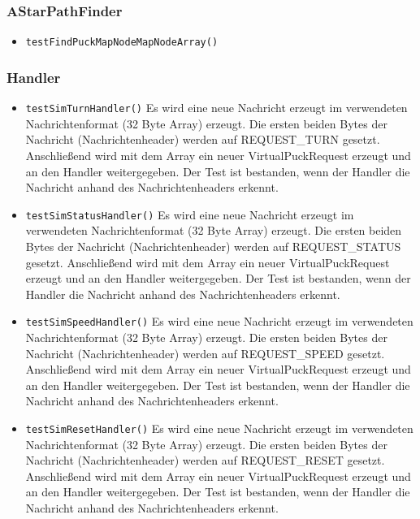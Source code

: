 \documentclass[10pt,a4paper]{article}
\begin{document}
			\subsubsection{AStarPathFinder}
			\begin{itemize}
				\item \texttt{testFindPuckMapNodeMapNodeArray()} 
			\end{itemize}
			
			\subsubsection{Handler}
			\begin{itemize}
				\item \texttt{testSimTurnHandler()} Es wird eine neue Nachricht erzeugt im verwendeten Nachrichtenformat (32 Byte Array) erzeugt.
				Die ersten beiden Bytes der Nachricht (Nachrichtenheader) werden auf REQUEST\_TURN gesetzt. Anschließend wird mit dem Array ein neuer
				VirtualPuckRequest erzeugt und an den Handler weitergegeben.
				Der Test ist bestanden, wenn der Handler die Nachricht anhand des Nachrichtenheaders erkennt.
				\item \texttt{testSimStatusHandler()} Es wird eine neue Nachricht erzeugt im verwendeten Nachrichtenformat (32 Byte Array) erzeugt.
				Die ersten beiden Bytes der Nachricht (Nachrichtenheader) werden auf REQUEST\_STATUS gesetzt. Anschließend wird mit dem Array ein
				neuer VirtualPuckRequest erzeugt und an den Handler weitergegeben.
				Der Test ist bestanden, wenn der Handler die Nachricht anhand des Nachrichtenheaders erkennt.
				\item \texttt{testSimSpeedHandler()} Es wird eine neue Nachricht erzeugt im verwendeten Nachrichtenformat (32 Byte Array) erzeugt.
				Die ersten beiden Bytes der Nachricht (Nachrichtenheader) werden auf REQUEST\_SPEED gesetzt. Anschließend wird mit dem Array ein
				neuer VirtualPuckRequest erzeugt und an den Handler weitergegeben.
				Der Test ist bestanden, wenn der Handler die Nachricht anhand des Nachrichtenheaders erkennt.
				\item \texttt{testSimResetHandler()} Es wird eine neue Nachricht erzeugt im verwendeten Nachrichtenformat (32 Byte Array) erzeugt.
				Die ersten beiden Bytes der Nachricht (Nachrichtenheader) werden auf REQUEST\_RESET gesetzt. Anschließend wird mit dem Array ein neuer
				VirtualPuckRequest erzeugt und an den Handler weitergegeben.
				Der Test ist bestanden, wenn der Handler die Nachricht anhand des Nachrichtenheaders erkennt.

\end{itemize}
\end{document}
